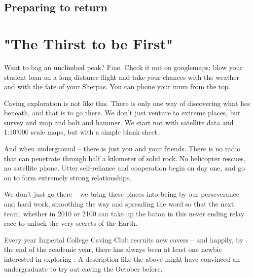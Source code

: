 \subsection{Preparing to return}

\section{"The Thirst to be First"}

Want to bag an unclimbed peak? Fine. Check it out on googlemaps; blow your student loan on a long distance flight and take your chances with the weather and with the fate of your Sherpas. You can phone your mum from the top.




Caving exploration is not like this. There is only one way of discovering what lies beneath, and that is to go there. We don't just venture to extreme places, but survey and map and bolt and hammer. We start not with satellite data and 1:10'000 scale maps, but with a simple blank sheet.

And when underground -- there is just you and your friends. There is no radio that can penetrate through half a kilometer of solid rock. No helicopter rescues, no satellite phone. Utter self-reliance and cooperation begin on day one, and go on to form extremely strong relationships.

We don't just go there -- we bring these places into being by our perseverance and hard work, smoothing the way and spreading the word so that the next team, whether in 2010 or 2100 can take up the baton in this never ending relay race to unlock the very secrets of the Earth.




Every year Imperial College Caving Club recruits new cavers -- and happily, by the end of the academic year, there has always been at least one newbie interested in exploring . A description like the above might have convinced an undergraduate to try out caving the October before.

